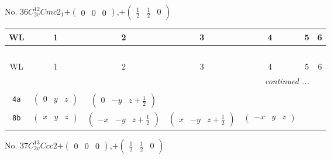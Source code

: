 \documentclass[fleqn,9pt,landscape]{jsarticle}
\begin{document}
\newpage
No. 36\quad$C_{2v}^{12}$\quad$Cmc2_1$\quad[ orthorhombic ]\quad$+\begin{pmatrix} 0 & 0 & 0 \end{pmatrix}$,\quad $+\begin{pmatrix} \frac{1}{2} & \frac{1}{2} & 0 \end{pmatrix}$
\begin{center}
\renewcommand{\arraystretch}{1.2}
\begin{longtable}{ccccccc}
 \hline \hline
WL & 1 & 2 & 3 & 4 & 5 & 6 \\ \hline \endfirsthead

\multicolumn{6}{l}{\tablename\ \thetable{}} \\
 \hline \hline
WL & 1 & 2 & 3 & 4 & 5 & 6 \\ \hline \endhead

 \hline \hline
\multicolumn{6}{r}{\footnotesize\it continued ...} \\ \endfoot

 \hline \hline
\multicolumn{6}{r}{} \\ \endlastfoot

{\tt 4a} & $ \begin{pmatrix} 0 & y & z \end{pmatrix} $ & $ \begin{pmatrix} 0 & - y & z + \frac{1}{2} \end{pmatrix} $ & $  $ & $  $ \\ \hline
{\tt 8b} & $ \begin{pmatrix} x & y & z \end{pmatrix} $ & $ \begin{pmatrix} - x & - y & z + \frac{1}{2} \end{pmatrix} $ & $ \begin{pmatrix} x & - y & z + \frac{1}{2} \end{pmatrix} $ & $ \begin{pmatrix} - x & y & z \end{pmatrix} $ \\
\end{longtable}
\end{center}
\newpage
No. 37\quad$C_{2v}^{13}$\quad$Ccc2$\quad[ orthorhombic ]\quad$+\begin{pmatrix} 0 & 0 & 0 \end{pmatrix}$,\quad $+\begin{pmatrix} \frac{1}{2} & \frac{1}{2} & 0 \end{pmatrix}$
\end{document}
